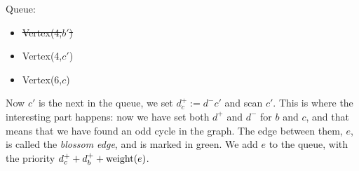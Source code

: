 \begin{minipage}{.75\linewidth}
\end{minipage}\hfill%
\begin{minipage}{.26\linewidth}
    Queue:
    \begin{itemize}
        \item \st{Vertex(4,$b'$)}
        \item Vertex(4,$c'$)
        \item Vertex(6,$c$)
    \end{itemize}
\end{minipage}

Now $c'$ is the next in the queue, we set $d^+_c := d^-c'$ and scan $c'$. This is where the interesting part happens: now we have set both $d^+$ and $d^-$ for $b$ and $c$, and that means that we have found an odd cycle in the graph. The edge between them, $e$, is called the \emph{blossom edge}, and is marked in green. We add $e$ to the queue, with the priority $d^+_c + d^+_b + \operatorname{weight}(e)$.


